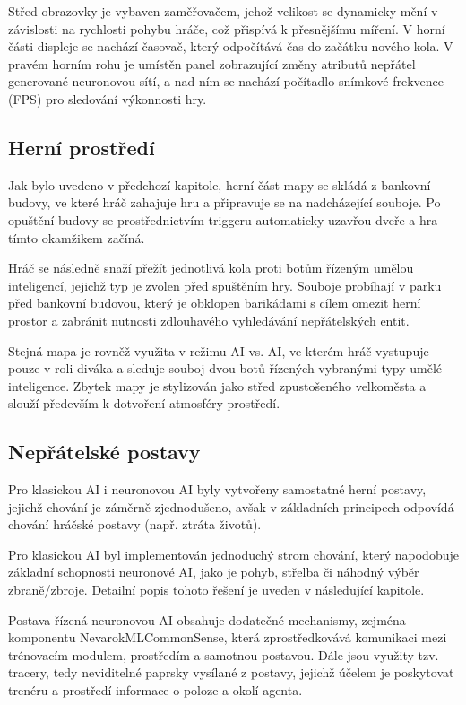 Střed obrazovky je vybaven zaměřovačem, jehož velikost se dynamicky mění v závislosti na rychlosti pohybu hráče, což přispívá k přesnějšímu míření. V horní části displeje se nachází časovač, který odpočítává čas do začátku nového kola. V pravém horním rohu je umístěn panel zobrazující změny atributů nepřátel generované neuronovou sítí, a nad ním se nachází počítadlo snímkové frekvence (FPS) pro sledování výkonnosti hry.

\subsection{Herní prostředí}
Jak bylo uvedeno v předchozí kapitole, herní část mapy se skládá z bankovní budovy, ve které hráč zahajuje hru a připravuje se na nadcházející souboje. Po opuštění budovy se prostřednictvím triggeru automaticky uzavřou dveře a hra tímto okamžikem začíná.

Hráč se následně snaží přežít jednotlivá kola proti botům řízeným umělou inteligencí, jejichž typ je zvolen před spuštěním hry. Souboje probíhají v parku před bankovní budovou, který je obklopen barikádami s cílem omezit herní prostor a zabránit nutnosti zdlouhavého vyhledávání nepřátelských entit.

Stejná mapa je rovněž využita v režimu AI vs. AI, ve kterém hráč vystupuje pouze v roli diváka a sleduje souboj dvou botů řízených vybranými typy umělé inteligence. Zbytek mapy je stylizován jako střed zpustošeného velkoměsta a slouží především k dotvoření atmosféry prostředí.

\subsection{Nepřátelské postavy}
Pro klasickou AI i neuronovou AI byly vytvořeny samostatné herní postavy, jejichž chování je záměrně zjednodušeno, avšak v základních principech odpovídá chování hráčské postavy (např. ztráta životů).

Pro klasickou AI byl implementován jednoduchý strom chování, který napodobuje základní schopnosti neuronové AI, jako je pohyb, střelba či náhodný výběr zbraně/zbroje. Detailní popis tohoto řešení je uveden v následující kapitole.

Postava řízená neuronovou AI obsahuje dodatečné mechanismy, zejména komponentu NevarokMLCommonSense, která zprostředkovává komunikaci mezi trénovacím modulem, prostředím a samotnou postavou. Dále jsou využity tzv. tracery, tedy neviditelné paprsky vysílané z postavy, jejichž účelem je poskytovat trenéru a prostředí informace o poloze a okolí agenta.

